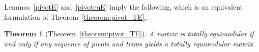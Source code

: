 \documentclass[11pt,a4paper]{amsart}
\theoremstyle{plain}
\newtheorem{theorem}{Theorem}[section]%
\theoremstyle{definition}
\begin{document}
Lemmas~\ref{pivotE} and~\ref{pivoteqE} imply the following, which is an equivalent formulation of Theorem~\ref{theorem:pivot_TE}.

\begin{theorem}[Theorem~\ref{theorem:pivot_TE}]\label{pivotpreserveTE}
A matrix is totally equimodular if and only if any sequence of pivots and trims yields a totally equimodular matrix.
\end{theorem}
%
%
%
%
%
%
\end{document}

